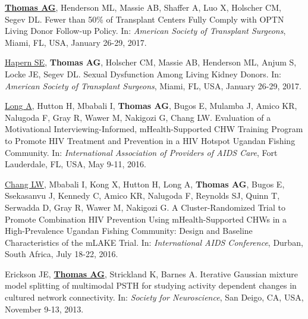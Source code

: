 \documentclass[10pt]{article}
\makeatletter
\newlength{\bibhang}
\newlength{\bibsep}
 {\@listi \global\bibsep\itemsep \global\advance\bibsep by\parsep}
\newenvironment{bibenum*}
  {\renewcommand\labelenumi{[\theenumi]}%
   \etaremune[
     topsep=0pt,
     itemsep=\bibsep,
     parsep=0pt,partopsep=0pt,
     itemindent=-\bibhang,
     leftmargin={\bibhang+\widthof{[999]}}]}
  {\endetaremune}
\makeatother
\begin{document}
\begin{bibenum*}
\item \underline{\textbf{Thomas AG}}, Henderson ML, Massie AB, Shaffer A,
  Luo X, Holscher CM, Segev DL. Fewer than 50\% of Transplant Centers Fully
  Comply with OPTN Living Donor Follow-up Policy.
  In: \emph{American Society of Transplant Surgeons},
  Miami, FL, USA, January 26-29, 2017.

\item \underline{Hapern SE}, \textbf{Thomas AG}, Holscher CM, Massie AB,
  Henderson ML, Anjum S, Locke JE, Segev DL.
  Sexual Dysfunction Among Living Kidney Donors.
  In: \emph{American Society of Transplant Surgeons},
  Miami, FL, USA, January 26-29, 2017.

\item \underline{Long A}, Hutton H, Mbabali I, \textbf{Thomas AG}, Bugos E, Mulamba J,
  Amico KR, Nalugoda F, Gray R, Wawer M, Nakigozi G, Chang LW.
  Evaluation of a Motivational Interviewing-Informed, mHealth-Supported
  CHW Training Program to Promote HIV Treatment and Prevention in a HIV
  Hotspot Ugandan Fishing Community. In:
  \emph{International Association of Providers of AIDS Care},
  Fort Lauderdale, FL, USA, May 9-11, 2016.

\item \underline{Chang LW}, Mbabali I, Kong X, Hutton H, Long A,
  \textbf{Thomas AG}, Bugos E, Ssekasanvu J, Kennedy C, Amico KR,
  Nalugoda F, Reynolds SJ, Quinn T, Serwadda D, Gray R, Wawer M, Nakigozi G.
  A Cluster-Randomized Trial to Promote Combination HIV Prevention
  Using mHealth-Supported CHWs in a High-Prevalence Ugandan Fishing
  Community: Design and Baseline Characteristics of the
  mLAKE Trial. In: \emph{International AIDS Conference},
  Durban, South Africa, July 18-22, 2016.

\item Erickson JE\dag, \underline{\textbf{Thomas AG}\dag}, Strickland K, Barnes A.
  Iterative Gaussian mixture model splitting
  of multimodal PSTH for studying activity dependent changes in
  cultured network connectivity. In: \emph{Society for Neuroscience},
  San Deigo, CA, USA, November 9-13, 2013.

\end{bibenum*}
\end{document}
